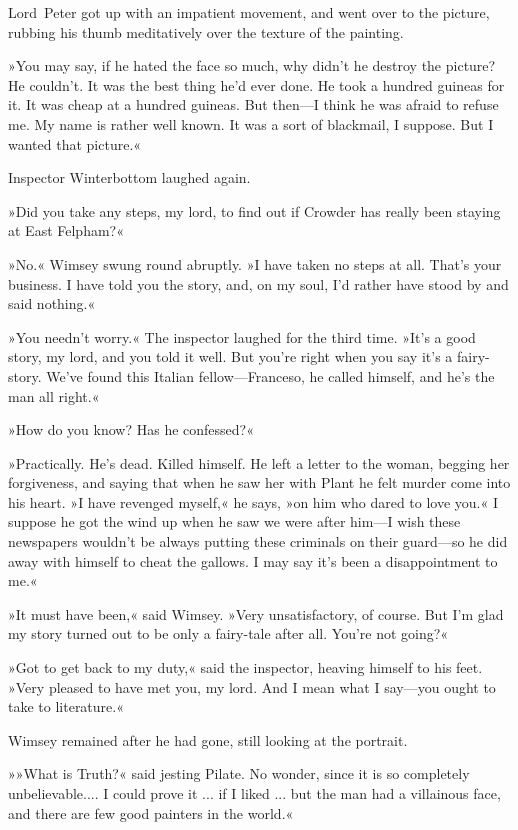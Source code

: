 Lord~Peter got up with an impatient movement, and went over to the picture, rubbing his thumb meditatively over the texture of the painting.

»You may say, if he hated the face so much, why didn't he destroy the picture? He couldn't. It was the best thing he'd ever done. He took a hundred guineas for it. It was cheap at a hundred guineas. But then—I think he was afraid to refuse me. My name is rather well known. It was a sort of blackmail, I suppose. But I wanted that picture.«

Inspector Winterbottom laughed again.

»Did you take any steps, my lord, to find out if Crowder has really been staying at East Felpham?«

»No.« Wimsey swung round abruptly. »I have taken no steps at all. That's your business. I have told you the story, and, on my soul, I'd rather have stood by and said nothing.«

»You needn't worry.« The inspector laughed for the third time. »It's a good story, my lord, and you told it well. But you're right when you say it's a fairy-story. We've found this Italian fellow—Franceso, he called himself, and he's the man all right.«

»How do you know? Has he confessed?«

»Practically. He's dead. Killed himself. He left a letter to the woman, begging her forgiveness, and saying that when he saw her with Plant he felt murder come into his heart. »I have revenged myself,« he says, »on him who dared to love you.« I suppose he got the wind up when he saw we were after him—I wish these newspapers wouldn't be always putting these criminals on their guard—so he did away with himself to cheat the gallows. I may say it's been a disappointment to me.«

»It must have been,« said Wimsey. »Very unsatisfactory, of course. But I'm glad my story turned out to be only a fairy-tale after all. You're not going?«

»Got to get back to my duty,« said the inspector, heaving himself to his feet. »Very pleased to have met you, my lord. And I mean what I say—you ought to take to literature.«

Wimsey remained after he had gone, still looking at the portrait.

»»What is Truth?« said jesting Pilate. No wonder, since it is so completely unbelievable.... I could prove it ... if I liked ... but the man had a villainous face, and there are few good painters in the world.«